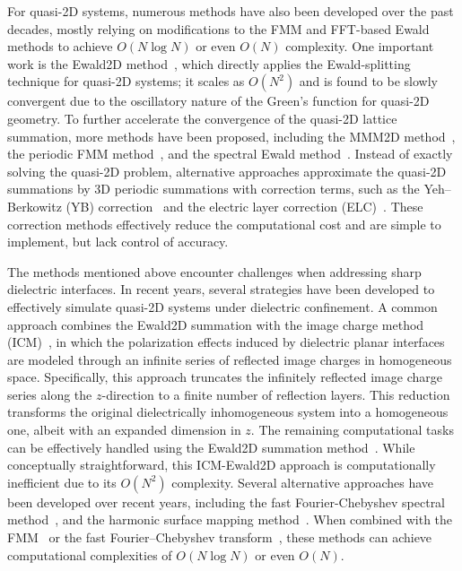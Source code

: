 For quasi-2D systems,  numerous methods have also been developed over the past decades, mostly relying on modifications to the FMM and FFT-based Ewald methods to achieve $O(N\log N)$ or even $O(N)$ complexity.
One important work is the Ewald2D method~\cite{parry1975electrostatic}, which directly applies the Ewald-splitting technique for quasi-2D systems; it scales as $O(N^2)$ and is found to be slowly convergent due to the oscillatory nature of the Green's function for quasi-2D geometry.
To further accelerate the convergence of the quasi-2D lattice summation, more methods have been proposed, including the MMM2D method~\cite{arnold2002mmm2d}, the periodic FMM method~\cite{yan2018flexibly}, and the spectral Ewald method~\cite{lindbo2012fast}.
Instead of exactly solving the quasi-2D problem, alternative approaches approximate the quasi-2D summations by 3D periodic summations with correction terms, such as the Yeh--Berkowitz (YB) correction~\cite{yeh1999ewald} and the electric layer correction (ELC)~\cite{arnold2002electrostatics}.
These correction methods effectively reduce the computational cost and are simple to implement, but lack control of accuracy.

The methods mentioned above encounter challenges when addressing sharp dielectric interfaces. In recent years, several strategies have been developed to effectively simulate quasi-2D systems under dielectric confinement.
A common approach combines the Ewald2D summation with the image charge method (ICM)~\cite{jackson1999classical,frenkel2023understanding}, in which the polarization effects induced by dielectric planar interfaces are modeled through an infinite series of reflected image charges in homogeneous space.
Specifically, this approach truncates the infinitely reflected image charge series along the $z$-direction to a finite number of reflection layers. 
This reduction transforms the original dielectrically inhomogeneous system into a homogeneous one, albeit with an expanded dimension in $z$.
The remaining computational tasks can be effectively handled using the Ewald2D summation method~\cite{parry1975electrostatic,zhonghanhu2014JCTC}. While conceptually straightforward, this ICM-Ewald2D approach is computationally inefficient due to its $O(N^2)$ complexity.
Several alternative approaches have been developed over recent years, including the fast Fourier-Chebyshev spectral method~\cite{maxian2021fast,gao2024fast}, and the harmonic surface mapping method~\cite{liang2020harmonic,liang2022hsma}.
When combined with the FMM~\cite{greengard1987fast,kohnke2020gpu} or the fast Fourier--Chebyshev transform~\cite{trefethen2000spectral}, these methods can achieve computational complexities of $ O(N\log N)$ or even $ O(N)$.

